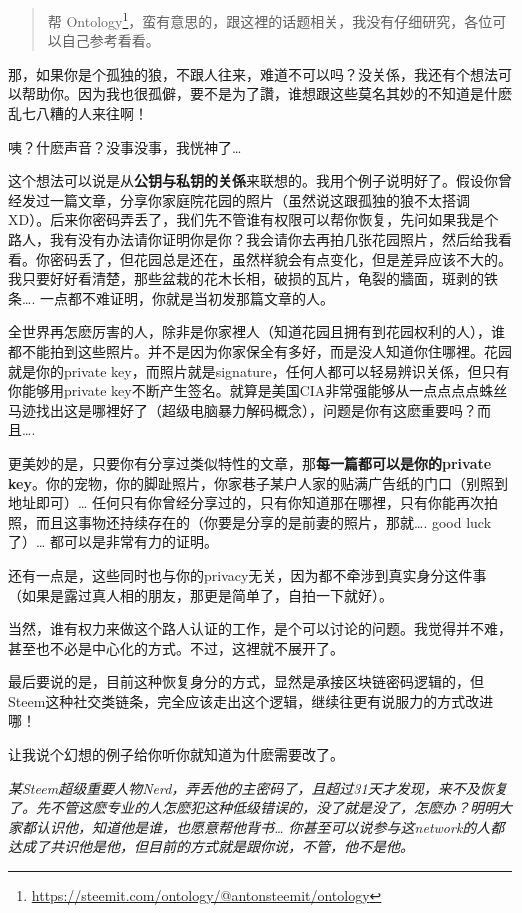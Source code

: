 \documentclass[]{ctexbook}
\renewcommand{\href}[2]{#2\footnote{\url{#1}}}
\begin{document}
\begin{quote}
帮 \citet{antonsteemit这位台湾的CN区小兄弟广告一下他介绍过一个项目}\href{https://steemit.com/ontology/@antonsteemit/ontology}{Ontology}，蛮有意思的，跟这裡的话题相关，我没有仔细研究，各位可以自己参考看看。
\end{quote}

那，如果你是个孤独的狼，不跟人往来，难道不可以吗？没关係，我还有个想法可以帮助你。因为我也很孤僻，要不是为了讚，谁想跟这些莫名其妙的不知道是什麽乱七八糟的人来往啊！

咦？什麽声音？没事没事，我恍神了\ldots{}

这个想法可以说是从\textbf{公钥与私钥的关係}来联想的。我用个例子说明好了。假设你曾经发过一篇文章，分享你家庭院花园的照片（虽然说这跟孤独的狼不太搭调 XD）。后来你密码弄丢了，我们先不管谁有权限可以帮你恢复，先问如果我是个路人，我有没有办法请你证明你是你？我会请你去再拍几张花园照片，然后给我看看。你密码丢了，但花园总是还在，虽然样貌会有点变化，但是差异应该不大的。我只要好好看清楚，那些盆栽的花木长相，破损的瓦片，龟裂的牆面，斑剥的铁条\ldots{}. 一点都不难证明，你就是当初发那篇文章的人。

全世界再怎麽厉害的人，除非是你家裡人（知道花园且拥有到花园权利的人），谁都不能拍到这些照片。并不是因为你家保全有多好，而是没人知道你住哪裡。花园就是你的private key，而照片就是signature，任何人都可以轻易辨识关係，但只有你能够用private key不断产生签名。就算是美国CIA非常强能够从一点点点点蛛丝马迹找出这是哪裡好了（超级电脑暴力解码概念），问题是你有这麽重要吗？而且\ldots{}.

更美妙的是，只要你有分享过类似特性的文章，那\textbf{每一篇都可以是你的private key}。你的宠物，你的脚趾照片，你家巷子某户人家的贴满广告纸的门口（别照到地址即可）\ldots{} 任何只有你曾经分享过的，只有你知道那在哪裡，只有你能再次拍照，而且这事物还持续存在的（你要是分享的是前妻的照片，那就\ldots{}. good luck了）\ldots{} 都可以是非常有力的证明。

还有一点是，这些同时也与你的privacy无关，因为都不牵涉到真实身分这件事（如果是露过真人相的朋友，那更是简单了，自拍一下就好）。

当然，谁有权力来做这个路人认证的工作，是个可以讨论的问题。我觉得并不难，甚至也不必是中心化的方式。不过，这裡就不展开了。

最后要说的是，目前这种恢复身分的方式，显然是承接区块链密码逻辑的，但Steem这种社交类链条，完全应该走出这个逻辑，继续往更有说服力的方式改进哪！

让我说个幻想的例子给你听你就知道为什麽需要改了。

\emph{某Steem超级重要人物Nerd，弄丢他的主密码了，且超过31天才发现，来不及恢复了。先不管这麽专业的人怎麽犯这种低级错误的，没了就是没了，怎麽办？明明大家都认识他，知道他是谁，也愿意帮他背书\ldots{} 你甚至可以说参与这network的人都达成了共识他是他，但目前的方式就是跟你说，不管，他不是他。}
\end{document}
